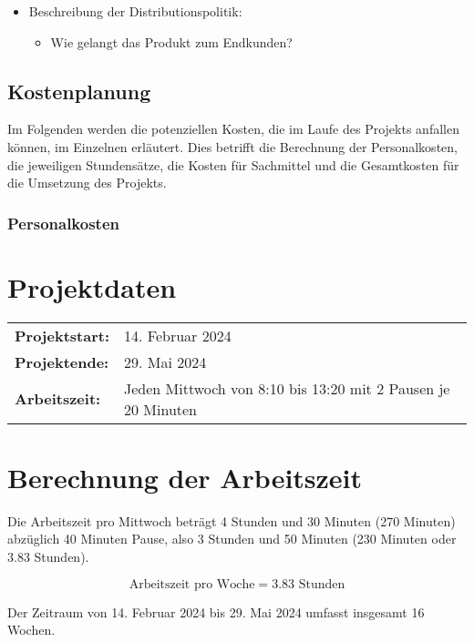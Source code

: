 \begin{itemize}
\item
  Beschreibung der Distributionspolitik:

  \begin{itemize}
  
  \item
    Wie gelangt das Produkt zum Endkunden?
  \end{itemize}
\end{itemize}

\subsection{Kostenplanung}\label{kostenplanung}

Im Folgenden werden die potenziellen Kosten, die im Laufe des Projekts anfallen können, im Einzelnen erläutert. Dies betrifft die Berechnung der Personalkosten, die jeweiligen Stundensätze, die Kosten für Sachmittel und die Gesamtkosten für die Umsetzung des Projekts.

\subsubsection{Personalkosten}\label{personalkosten}

\section*{Projektdaten}
\begin{tabular}{ll}
  \toprule
  \textbf{Projektstart:} & 14. Februar 2024 \\
  \textbf{Projektende:} & 29. Mai 2024 \\
  \textbf{Arbeitszeit:} & Jeden Mittwoch von 8:10 bis 13:20 mit 2 Pausen je 20 Minuten \\
  \bottomrule
\end{tabular}

\section*{Berechnung der Arbeitszeit}
Die Arbeitszeit pro Mittwoch beträgt 4 Stunden und 30 Minuten (270 Minuten) abzüglich 40 Minuten Pause, also 3 Stunden und 50 Minuten (230 Minuten oder 3.83 Stunden).

\[
  \text{Arbeitszeit pro Woche} = 3.83 \text{ Stunden}
\]

Der Zeitraum von 14. Februar 2024 bis 29. Mai 2024 umfasst insgesamt 16 Wochen.

